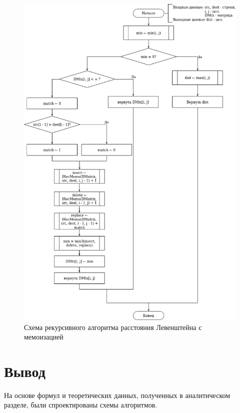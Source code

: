 \begin{figure}[h!]
	\begin{center}
		\includegraphics[scale=0.6]{./assets/leven-matrix-memo.png}
	\end{center}
	
	\caption{Схема рекурсивного алгоритма расстояния Левенштейна с мемоизацией}
	\label{fig:l-recur-matrix}
\end{figure}



\section{Вывод}
На основе формул и теоретических данных, полученных в аналитическом разделе, были спроектированы схемы алгоритмов.